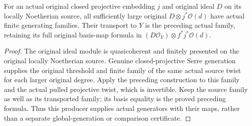 \begin{lemma}
\leanok
\label{lem:kn-nadel-nef-big-global-controlled-generators}
For an actual original closed projective embedding $j$ and original ideal
$D$ on its locally Noetherian source, all sufficiently large original
$D\otimes j^*\mathcal O(d)$ have actual finite generating families. Their
transport to $Y$ is the preceding actual family, retaining its full original
basis-map formula in $(D\mathcal O_Y)\otimes f^*j^*\mathcal O(d)$.
\end{lemma}
\begin{proof}
The original ideal module is quasicoherent and finitely presented on the
original locally Noetherian source. Genuine closed-projective Serre
generation supplies the original threshold and finite family of the same
actual source twist for each larger original degree. Apply the preceding
construction to this family and the actual pulled projective twist,
which is invertible. Keep the source family as well as its transported
family; its basis equality is the proved preceding formula. Thus this
producer supplies actual generators with their maps, rather than a
separate global-generation or comparison certificate.
\end{proof}

